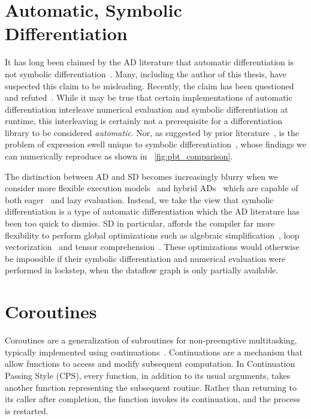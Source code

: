 \documentclass[12pt,initial,twoside,maitrise]{dms}
\numberwithin{equation}{section}
\numberwithin{table}{chapter}
\numberwithin{figure}{chapter}
\begin{document}
\section{Automatic, Symbolic Differentiation}

It has long been claimed by the AD literature that automatic differentiation is not symbolic differentiation~\citep{baydin-survey}. Many, including the author of this thesis, have suspected this claim to be misleading. Recently, the claim has been questioned~\citep{wang2018demystifying} and refuted~\citep{laue2019equivalence}. While it may be true that certain implementations of automatic differentiation interleave numerical evaluation and symbolic differentiation at runtime, this interleaving is certainly not a prerequisite for a differentiation library to be considered \textit{automatic}. Nor, as suggested by prior literature~\citep{baydin2014ad}, is the problem of expression swell unique to symbolic differentiation~\citep{laue2019equivalence}, whose findings we can numerically reproduce as shown in ~\autoref{fig:pbt_comparison}.

The distinction between AD and SD becomes increasingly blurry when we consider more flexible execution models~\citep{wang2018demystifying} and hybrid ADs~\citep{abadi2016tensorflow} which are capable of both eager~\citep{agrawal2019tensorflow} and lazy evaluation. Instead, we take the view that symbolic differentiation is a type of automatic differentiation which the AD literature has been too quick to dismiss. SD in particular, affords the compiler far more flexibility to perform global optimizations such as algebraic simplification~\citep{bergstra2010theano}, loop vectorization~\citep{agarwal2019static} and tensor comprehension~\citep{vasilache2018tensor}. These optimizations would otherwise be impossible if their symbolic differentiation and numerical evaluation were performed in lockstep, when the dataflow graph is only partially available.

\section{Coroutines}\label{sec:coroutines}

Coroutines are a generalization of subroutines for non-preemptive multitasking, typically implemented using continuations~\citep{haynes1984continuations}. Continuations are a mechanism that allow functions to access and modify subsequent computation. In Continuation Passing Style \citep{sussman1975scheme} (CPS), every function, in addition to its usual arguments, takes another function representing the subsequent routine. Rather than returning to its caller after completion, the function invokes its continuation, and the process is restarted.
\end{document}
